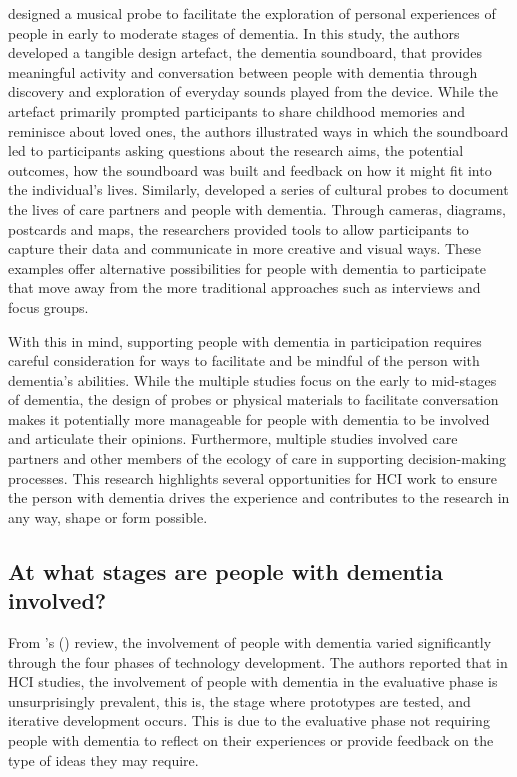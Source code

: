 \cite{houben_foregrounding_2019} designed a musical probe to facilitate the exploration of personal experiences of people in early to moderate stages of dementia. In this study, the authors developed a tangible design artefact, the dementia soundboard, that provides meaningful activity and conversation between people with dementia through discovery and exploration of everyday sounds played from the device. While the artefact primarily prompted participants to share childhood memories and reminisce about loved ones, the authors illustrated ways in which the soundboard led to participants asking questions about the research aims, the potential outcomes, how the soundboard was built and feedback on how it might fit into the individual's lives. Similarly, \cite{brown2014using} developed a series of cultural probes to document the lives of care partners and people with dementia. Through cameras, diagrams, postcards and maps, the researchers provided tools to allow participants to capture their data and communicate in more creative and visual ways. These examples offer alternative possibilities for people with dementia to participate that move away from the more traditional approaches such as interviews and focus groups. 

With this in mind, supporting people with dementia in participation requires careful consideration for ways to facilitate and be mindful of the person with dementia's abilities. While the multiple studies focus on the early to mid-stages of dementia, the design of probes or physical materials to facilitate conversation makes it potentially more manageable for people with dementia to be involved and articulate their opinions. Furthermore, multiple studies involved care partners and other members of the ecology of care in supporting decision-making processes. This research highlights several opportunities for HCI work to ensure the person with dementia drives the experience and contributes to the research in any way, shape or form possible.

\subsection{At what stages are people with dementia involved?}
\label{BL:DevelopmentPhases}
From \citeauthor{suijkerbuijk_active_2019}'s (\citeyear{suijkerbuijk_active_2019}) review, the involvement of people with dementia varied significantly through the four phases of technology development. The authors reported that in HCI studies, the involvement of people with dementia in the evaluative phase is unsurprisingly prevalent, this is, the stage where prototypes are tested, and iterative development occurs. This is due to the evaluative phase not requiring people with dementia to reflect on their experiences or provide feedback on the type of ideas they may require. 

